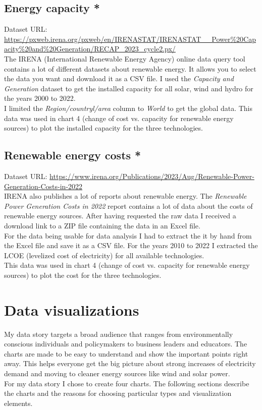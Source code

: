 \documentclass{article}
\begin{document}
\subsection{Energy capacity *}
Dataset URL: \url{https://pxweb.irena.org/pxweb/en/IRENASTAT/IRENASTAT\_\_Power\%20Capacity\%20and\%20Generation/RECAP\_2023\_cycle2.px/} \\
The IRENA (International Renewable Energy Agency) online data query tool contains a lot of different datasets about renewable energy. It allows you to select the data you want and download it as a CSV file.
I used the \textit{Capacity and Generation} dataset to get the installed capacity for all solar, wind and hydro for the years 2000 to 2022. \\
I limited the \textit{Region/countryl/area} column to \textit{World} to get the global data. This data was used in chart 4 (change of cost vs. capacity for renewable energy sources) to plot the installed capacity for the three technologies. \\


\subsection{Renewable energy costs *}
Dataset URL: \url{https://www.irena.org/Publications/2023/Aug/Renewable-Power-Generation-Costs-in-2022} \\
IRENA also publishes a lot of reports about renewable energy. The \textit{Renewable Power Generation Costs in 2022} report contains a lot of data about the costs of renewable energy sources.
After having requested the raw data I received a download link to a ZIP file containing the data in an Excel file. \\
For the data being usable for data analysis I had to extract the it by hand from the Excel file and save it as a CSV file.
For the years 2010 to 2022 I extracted the LCOE (levelized cost of electricity) for all available technologies. \\
This data was used in chart 4 (change of cost vs. capacity for renewable energy sources) to plot the cost for the three technologies.

\newpage

\section{Data visualizations}
My data story targets a broad audience that ranges from environmentally conscious individuals and policymakers to business leaders and educators.
The charts are made to be easy to understand and show the important points right away.
This helps everyone get the big picture about strong increases of electricity demand and moving to cleaner energy sources like wind and solar power. \\
For my data story I chose to create four charts. The following sections describe the charts and the reasons for choosing particular types and visualization elements.
\end{document}
